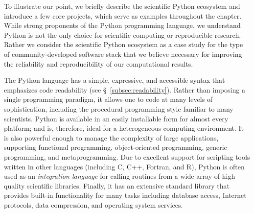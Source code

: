 \documentclass[11pt,oneside,english]{article}
\begin{document}
To illustrate our point, we briefly describe the scientific Python ecosystem
\cite{oliphant2007python,millman2011python,Perez2011} and introduce a few
core projects, which serve as examples throughout the chapter.  While
strong proponents of the Python programming language, we understand Python is
not the only choice for scientific computing or reproducible research.  Rather
we consider the scientific Python ecosystem as a case study for the type of
community-developed software stack that we believe necessary for improving the
reliability and reproducibility of our computational results. 

The Python language has a simple, expressive, and accessible syntax that
emphasizes code readability (see §~\ref{subsec:readability}).  Rather than
imposing a single programming paradigm, it allows one to code at many levels of
sophistication, including the procedural programming style familiar to many
scientists. Python is available in an easily installable form for almost every
platform; and is, therefore, ideal for a heterogeneous computing environment.
It is also powerful enough to manage the complexity of large applications,
supporting functional programming, object-oriented programming, generic
programming, and metaprogramming.  Due to excellent support for scripting tools
written in other languages (including C, C++, Fortran, and R), Python is often
used as an \emph{integration language} for calling routines from a wide array
of high-quality scientific libraries.  Finally, it has an extensive standard
library that provides built-in functionality for many tasks including database
access, Internet protocols, data compression, and operating system services.
\end{document}
